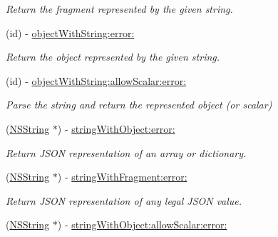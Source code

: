 \begin{DoxyCompactItemize}
\begin{DoxyCompactList}\small\item\em \-Return the fragment represented by the given string. \end{DoxyCompactList}\item 
\hypertarget{interface_s_b_j_s_o_n_a2b0ae389a765270663c1e1110bcef613}{
(id) -\/ \hyperlink{interface_s_b_j_s_o_n_a2b0ae389a765270663c1e1110bcef613}{object\-With\-String\-:error\-:}}
\label{interface_s_b_j_s_o_n_a2b0ae389a765270663c1e1110bcef613}

\begin{DoxyCompactList}\small\item\em \-Return the object represented by the given string. \end{DoxyCompactList}\item 
\hypertarget{interface_s_b_j_s_o_n_a942831fa293980ad189b72860055d32a}{
(id) -\/ \hyperlink{interface_s_b_j_s_o_n_a942831fa293980ad189b72860055d32a}{object\-With\-String\-:allow\-Scalar\-:error\-:}}
\label{interface_s_b_j_s_o_n_a942831fa293980ad189b72860055d32a}

\begin{DoxyCompactList}\small\item\em \-Parse the string and return the represented object (or scalar) \end{DoxyCompactList}\item 
\hypertarget{interface_s_b_j_s_o_n_a3687db463abee044cb06e0924142deb8}{
(\hyperlink{class_n_s_string}{\-N\-S\-String} $\ast$) -\/ \hyperlink{interface_s_b_j_s_o_n_a3687db463abee044cb06e0924142deb8}{string\-With\-Object\-:error\-:}}
\label{interface_s_b_j_s_o_n_a3687db463abee044cb06e0924142deb8}

\begin{DoxyCompactList}\small\item\em \-Return \-J\-S\-O\-N representation of an array or dictionary. \end{DoxyCompactList}\item 
\hypertarget{interface_s_b_j_s_o_n_a006d605894edce824a18ec157ec28a3e}{
(\hyperlink{class_n_s_string}{\-N\-S\-String} $\ast$) -\/ \hyperlink{interface_s_b_j_s_o_n_a006d605894edce824a18ec157ec28a3e}{string\-With\-Fragment\-:error\-:}}
\label{interface_s_b_j_s_o_n_a006d605894edce824a18ec157ec28a3e}

\begin{DoxyCompactList}\small\item\em \-Return \-J\-S\-O\-N representation of any legal \-J\-S\-O\-N value. \end{DoxyCompactList}\item 
\hypertarget{interface_s_b_j_s_o_n_a1daa6e2cb4bac21afe6c884ece6dc4ad}{
(\hyperlink{class_n_s_string}{\-N\-S\-String} $\ast$) -\/ \hyperlink{interface_s_b_j_s_o_n_a1daa6e2cb4bac21afe6c884ece6dc4ad}{string\-With\-Object\-:allow\-Scalar\-:error\-:}}
\label{interface_s_b_j_s_o_n_a1daa6e2cb4bac21afe6c884ece6dc4ad}


\end{DoxyCompactItemize}

